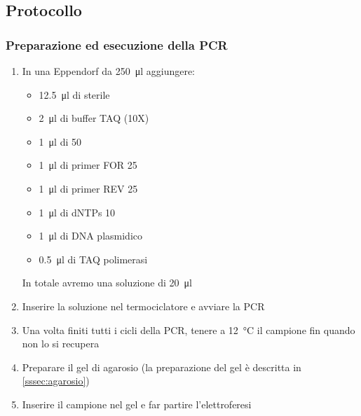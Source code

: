 \subsection{Protocollo}
\subsubsection{Preparazione ed esecuzione della PCR }
\begin{enumerate}
	\item In una Eppendorf da \qty{250}{\micro\litre} aggiungere:
	      \begin{itemize}[person]
		      \item \qty{12.5}{\micro\litre} di  sterile
		      \item \qty{2}{\micro\litre} di buffer TAQ (10X)
		      \item \qty{1}{\micro\litre} di  \qty{50}{\milli\Molar}
		      \item \qty{1}{\micro\litre} di primer FOR \qty{25}{\milli\Molar}
		      \item \qty{1}{\micro\litre} di primer REV \qty{25}{\milli\Molar}
		      \item \qty{1}{\micro\litre} di dNTPs \qty{10}{\milli\Molar}
		      \item \qty{1}{\micro\litre} di DNA plasmidico
		      \item \qty{0.5}{\micro\litre} di TAQ polimerasi
	      \end{itemize}
	      In totale avremo una soluzione di \qty{20}{\micro\litre}
	\item Inserire la soluzione nel termociclatore e avviare la PCR
	\item Una volta finiti tutti i cicli della PCR, tenere a \qty{12}{\celsius} il campione fin quando non lo si recupera
	\item Preparare il gel di agarosio (la preparazione del gel è descritta in \ref{sssec:agarosio})
	\item Inserire il campione nel gel e far partire l'elettroferesi
\end{enumerate}

